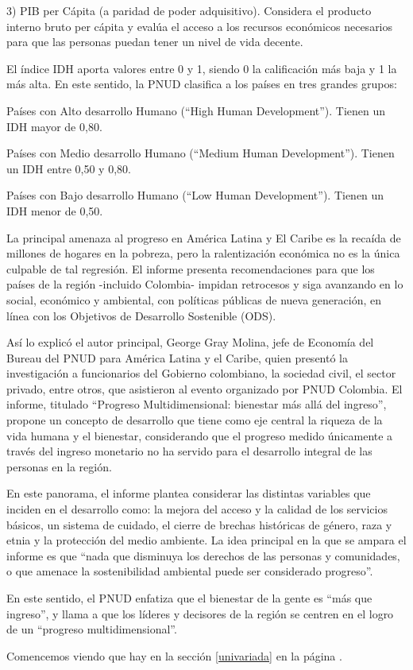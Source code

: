 \documentclass{article}
\begin{document}
3) PIB per Cápita (a paridad de poder adquisitivo). Considera el producto interno bruto per cápita y evalúa el acceso a los recursos económicos necesarios para que las personas puedan tener un nivel de vida decente.

El índice IDH aporta valores entre 0 y 1,  siendo 0 la calificación más baja y 1 la más alta. En este sentido, la PNUD clasifica a los países en tres grandes grupos:

Países con Alto desarrollo Humano (“High Human Development”).  Tienen un IDH mayor de 0,80. 

Países con Medio desarrollo Humano (“Medium Human Development”). Tienen un IDH entre 0,50 y 0,80.

Países con Bajo desarrollo Humano (“Low Human Development”). Tienen un IDH menor de 0,50.

La principal amenaza al progreso en América Latina y El Caribe es la recaída de millones de hogares en la pobreza, pero la ralentización económica no es la única culpable de tal regresión. El informe presenta recomendaciones para que los países de la región -incluido Colombia- impidan retrocesos y siga avanzando en lo social, económico y ambiental, con políticas públicas de nueva generación, en línea con los Objetivos de Desarrollo Sostenible (ODS).

Así lo explicó el autor principal, George Gray Molina, jefe de Economía del Bureau del PNUD para América Latina y el Caribe, quien presentó la investigación a funcionarios del Gobierno colombiano, la sociedad civil, el sector privado, entre otros, que asistieron al evento organizado por PNUD Colombia.
El informe, titulado “Progreso Multidimensional: bienestar más allá del ingreso”, propone un concepto de desarrollo que tiene como eje central la riqueza de la vida humana y el bienestar, considerando que el progreso medido únicamente a través del ingreso monetario no ha servido para el desarrollo integral de las personas en la región. 

En este panorama, el informe plantea considerar las distintas variables que inciden en el desarrollo como: la mejora del acceso y la calidad de los servicios básicos, un sistema de cuidado, el cierre de brechas históricas de género, raza y etnia y la protección del medio ambiente. La idea principal en la que se ampara el informe es que “nada que disminuya los derechos de las personas y comunidades, o que amenace la sostenibilidad ambiental puede ser considerado progreso”. 

En este sentido, el PNUD enfatiza que el bienestar de la gente es “más que ingreso”, y llama a que los líderes y decisores de la región se centren en el logro de un “progreso multidimensional”.


Comencemos viendo que hay en la sección \ref{univariada} en la página \pageref{univariada}.

\clearpage







\renewcommand{\refname}{Bibliography}

\end{document}
